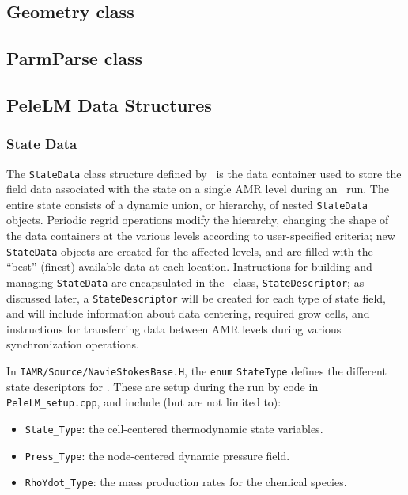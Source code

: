 \subsection{Geometry class}

\subsection{ParmParse class}

\subsection{PeleLM Data Structures}

\subsubsection{State Data}

The {\tt StateData} class structure defined by \amrex\ is the data container
used to store the field data associated with the state on a single AMR level
during an \pelelm\ run.  The entire state consists of a dynamic union, or hierarchy, of
nested {\tt StateData} objects.  Periodic regrid operations modify the hierarchy,
changing the shape of the data containers at the various levels according to
user-specified criteria; new {\tt StateData} objects are created
for the affected levels, and are filled with the ``best'' (finest) available 
data at each location. Instructions for building and managing {\tt StateData} are
encapsulated in the \amrex\ class, {\tt StateDescriptor}; as discussed later,
a {\tt StateDescriptor} will be created for each type of state field, and 
will include information about data centering, required grow cells, and
instructions for transferring data between AMR levels during various synchronization
operations.

In {\tt IAMR/Source/NavieStokesBase.H}, the {\tt enum} {\tt StateType} defines the
different state descriptors for \pelelm.  These are setup during the
run by code in {\tt PeleLM\_setup.cpp}, and include (but are not limited to):
\begin{itemize}
\item {\tt State\_Type}: the cell-centered thermodynamic state variables.

\item {\tt Press\_Type}: the node-centered dynamic pressure field.

\item {\tt RhoYdot\_Type}: the mass production rates for the chemical species.  
  
\end{itemize}

